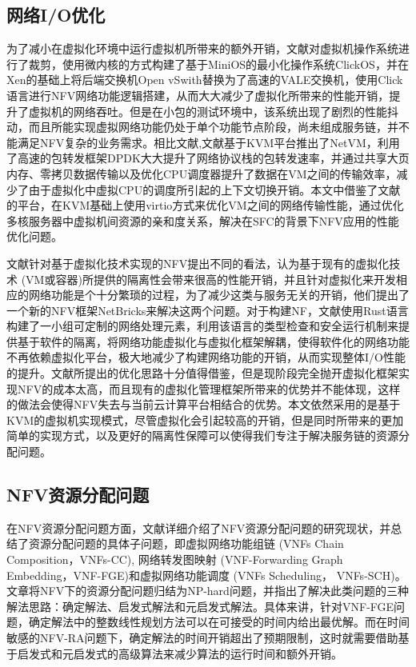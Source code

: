 \subsection{网络I/O优化}
为了减小在虚拟化环境中运行虚拟机所带来的额外开销，文献对虚拟机操作系统进行了裁剪，使用微内核的方式构建了基于MiniOS\cite{popuri2014tour}的最小化操作系统ClickOS，并在Xen\cite{barham2003xen}的基础上将后端交换机Open vSwith\cite{pfaff2015design}替换为了高速的VALE交换机\cite{rizzo2012netmap}，使用Click语言\cite{kohler2000click}进行NFV网络功能逻辑搭建，从而大大减少了虚拟化所带来的性能开销，提升了虚拟机的网络吞吐。但是在小包的测试环境中，该系统出现了剧烈的性能抖动，而且所能实现虚拟网络功能仍处于单个功能节点阶段，尚未组成服务链，并不能满足NFV复杂的业务需求。相比文献,文献基于KVM平台\cite{kivity2007kvm}推出了NetVM，利用了高速的包转发框架DPDK\cite{intel2015data}大大提升了网络协议栈的包转发速率，并通过共享大页内存、零拷贝数据传输以及优化CPU调度器提升了数据在VM之间的传输效率，减少了由于虚拟化中虚拟CPU的调度所引起的上下文切换开销。本文中借鉴了文献的平台，在KVM基础上使用virtio\cite{russell2008virtio}方式来优化VM之间的网络传输性能，通过优化多核服务器中虚拟机间资源的亲和度关系，解决在SFC的背景下NFV应用的性能优化问题。

文献针对基于虚拟化技术实现的NFV提出不同的看法，认为基于现有的虚拟化技术 (VM或容器)所提供的隔离性会带来很高的性能开销，并且针对虚拟化来开发相应的网络功能是个十分繁琐的过程，为了减少这类与服务无关的开销，他们提出了一个新的NFV框架NetBricks来解决这两个问题。对于构建NF，文献使用Rust语言构建了一小组可定制的网络处理元素，利用该语言的类型检查和安全运行机制来提供基于软件的隔离，将网络功能虚拟化与虚拟化框架解耦，使得软件化的网络功能不再依赖虚拟化平台，极大地减少了构建网络功能的开销，从而实现整体I/O性能的提升。文献所提出的优化思路十分值得借鉴，但是现阶段完全抛开虚拟化框架实现NFV的成本太高，而且现有的虚拟化管理框架所带来的优势并不能体现，这样的做法会使得NFV失去与当前云计算平台相结合的优势。本文依然采用的是基于KVM的虚拟机实现模式，尽管虚拟化会引起较高的开销，但是同时所带来的更加简单的实现方式，以及更好的隔离性保障可以使得我们专注于解决服务链的资源分配问题。


\subsection{NFV资源分配问题}
在NFV资源分配问题方面，文献详细介绍了NFV资源分配问题的研究现状，并总结了资源分配问题的具体子问题，即虚拟网络功能组链 (VNFs Chain Composition，VNFs-CC), 网络转发图映射 (VNF-Forwarding Graph Embedding，VNF-FGE)和虚拟网络功能调度 (VNFs Scheduling， VNFs-SCH)。文章将NFV下的资源分配问题归结为NP-hard问题，并指出了解决此类问题的三种解法思路：确定解法、启发式解法和元启发式解法。具体来讲，针对VNF-FGE问题，确定解法中的整数线性规划方法可以在可接受的时间内给出最优解。而在时间敏感的NFV-RA问题下，确定解法的时间开销超出了预期限制，这时就需要借助基于启发式和元启发式的高级算法来减少算法的运行时间和额外开销。

